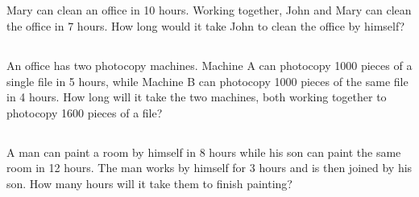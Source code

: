 \subsection{} Mary can clean an office in 10 hours. Working together, John and Mary can clean the
	office in 7 hours. How long would it take John to clean the office by himself?

\subsection{} An office has two photocopy machines. Machine A can photocopy 1000 pieces of a single
	file in 5 hours, while Machine B can photocopy 1000 pieces of the same file in 4 hours. How long
	will it take the two machines, both working together to photocopy 1600 pieces of a file?

\subsection{} A man can paint a room by himself in 8 hours while his son can paint the same room in
	12 hours. The man works by himself for 3 hours and is then joined by his son. How many hours will
	it take them to finish painting?

